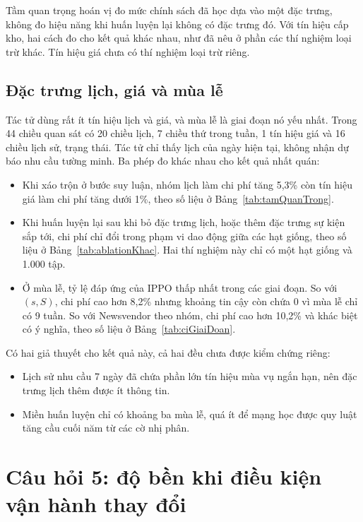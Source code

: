 Tầm quan trọng hoán vị đo mức chính sách đã học dựa vào một đặc trưng, không đo hiệu năng khi huấn luyện lại không có đặc trưng đó. Với tín hiệu cấp kho, hai cách đo cho kết quả khác nhau, như đã nêu ở phần các thí nghiệm loại trừ khác. Tín hiệu giá chưa có thí nghiệm loại trừ riêng.

\subsection{Đặc trưng lịch, giá và mùa lễ}
\label{subsec:lichGia}

Tác tử dùng rất ít tín hiệu lịch và giá, và mùa lễ là giai đoạn nó yếu nhất. Trong 44 chiều quan sát có 20 chiều lịch, 7 chiều thứ trong tuần, 1 tín hiệu giá và 16 chiều lịch sử, trạng thái. Tác tử chỉ thấy lịch của ngày hiện tại, không nhận dự báo nhu cầu tường minh. Ba phép đo khác nhau cho kết quả nhất quán:
\begin{itemize}
    \item Khi xáo trộn ở bước suy luận, nhóm lịch làm chi phí tăng 5,3\% còn tín hiệu giá làm chi phí tăng dưới 1\%, theo số liệu ở Bảng~\ref{tab:tamQuanTrong}.
    \item Khi huấn luyện lại sau khi bỏ đặc trưng lịch, hoặc thêm đặc trưng sự kiện sắp tới, chi phí chỉ đổi trong phạm vi dao động giữa các hạt giống, theo số liệu ở Bảng~\ref{tab:ablationKhac}. Hai thí nghiệm này chỉ có một hạt giống và 1.000 tập.
    \item Ở mùa lễ, tỷ lệ đáp ứng của IPPO thấp nhất trong các giai đoạn. So với $(s,S)$, chi phí cao hơn 8,2\% nhưng khoảng tin cậy còn chứa 0 vì mùa lễ chỉ có 9 tuần. So với Newsvendor theo nhóm, chi phí cao hơn 10,2\% và khác biệt có ý nghĩa, theo số liệu ở Bảng~\ref{tab:ciGiaiDoan}.
\end{itemize}

Có hai giả thuyết cho kết quả này, cả hai đều chưa được kiểm chứng riêng:
\begin{itemize}
    \item Lịch sử nhu cầu 7 ngày đã chứa phần lớn tín hiệu mùa vụ ngắn hạn, nên đặc trưng lịch thêm được ít thông tin.
    \item Miền huấn luyện chỉ có khoảng ba mùa lễ, quá ít để mạng học được quy luật tăng cầu cuối năm từ các cờ nhị phân.
\end{itemize}

\section{Câu hỏi 5: độ bền khi điều kiện vận hành thay đổi}
\label{sec:cau5}


